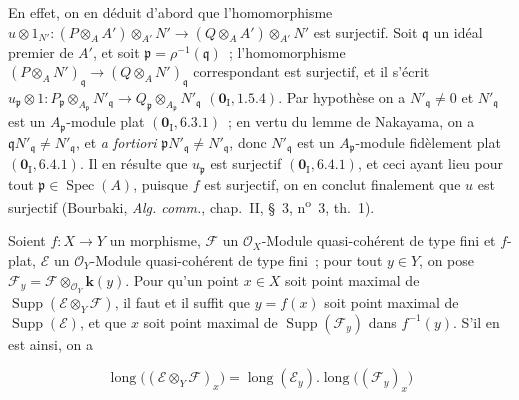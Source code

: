 En effet, on en déduit d'abord que l'homomorphisme
$u\otimes 1_{N'}:(P\otimes_A A')\otimes_{A'}N'
\longrightarrow(Q\otimes_A A')\otimes_{A'}N'$
est surjectif. Soit $\mathfrak q$ un idéal premier de $A'$, et soit
$\mathfrak p=\rho^{-1}(\mathfrak q)$~; l'homomorphisme
$(P\otimes_A N')_{\mathfrak q}\to(Q\otimes_A N')_{\mathfrak q}$
correspondant est surjectif, et il s'écrit
$u_{\mathfrak p}\otimes 1:
P_{\mathfrak p}\otimes_{A_{\mathfrak p}}N'_{\mathfrak q}
\longrightarrow
Q_{\mathfrak p}\otimes_{A_{\mathfrak p}}N'_{\mathfrak q}$
$(\mathbf{0}_{\mathrm I},1.5.4)$.
Par hypothèse on a $N'_{\mathfrak q}\ne0$ et $N'_{\mathfrak q}$ est un
$A_{\mathfrak p}$-module plat $(\mathbf{0}_{\mathrm I},6.3.1)$~; en vertu du lemme de
Nakayama, on a
$\mathfrak qN'_{\mathfrak q}\ne N'_{\mathfrak q}$, et \emph{a fortiori}
$\mathfrak pN'_{\mathfrak q}\ne N'_{\mathfrak q}$, donc
$N'_{\mathfrak q}$ est un $A_{\mathfrak p}$-module fidèlement plat
$(\mathbf{0}_{\mathrm I},6.4.1)$. Il en résulte que $u_{\mathfrak p}$ est surjectif
$(\mathbf{0}_{\mathrm I},6.4.1)$, et ceci ayant lieu pour tout
$\mathfrak p\in\operatorname{Spec}(A)$, puisque $f$ est surjectif, on en
conclut finalement que $u$ est surjectif (Bourbaki, \emph{Alg. comm.},
chap.~II, \S~3, n\textsuperscript{o}~3, th.~1).

\begin{proposition}[2.5.5]
\label{IV.2.5.5-fr}
Soient $f:X\to Y$ un morphisme, $\mathscr F$ un $\mathcal O_X$-Module
quasi-cohérent de type fini et $f$-plat, $\mathscr E$ un
$\mathcal O_Y$-Module quasi-cohérent de type fini~; pour tout $y\in Y$, on
pose $\mathscr F_y=\mathscr F\otimes_{\mathcal O_Y}\boldsymbol{k}(y)$. Pour qu'un point
$x\in X$ soit point maximal de
$\operatorname{Supp}(\mathscr E\otimes_Y\mathscr F)$, il faut et il suffit que
$y=f(x)$ soit point maximal de $\operatorname{Supp}(\mathscr E)$, et que $x$
soit point maximal de $\operatorname{Supp}(\mathscr F_y)$ dans $f^{-1}(y)$.
S'il en est ainsi, on a
\end{proposition}

\begin{env}[2.5.5.1]
\label{IV.2.5.5.1-fr}
\[
\operatorname{long}\bigl((\mathscr E\otimes_Y\mathscr F)_x\bigr)
=\operatorname{long}(\mathscr E_y).
 \operatorname{long}\bigl((\mathscr F_y)_x\bigr)
\]
\end{env}

